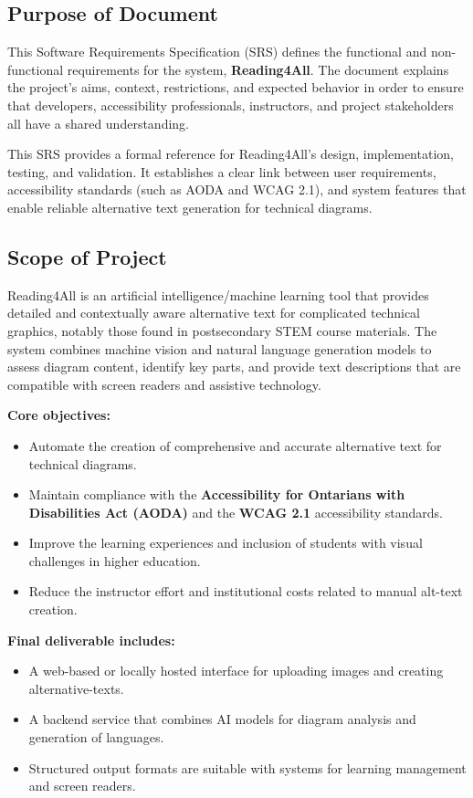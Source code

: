 \documentclass[12pt]{article}
\begin{document}
\subsection{Purpose of Document}
This Software Requirements Specification (SRS) defines the functional
and non-functional requirements for the \progname{} system,
\textbf{Reading4All}. The document explains the project's aims,
context, restrictions, and expected behavior in order to ensure that
developers, accessibility professionals, instructors, and project
stakeholders all have a shared understanding.

This SRS provides a formal reference for Reading4All's design,
implementation, testing, and validation. It establishes a clear link
between user requirements, accessibility standards (such as AODA and
WCAG 2.1), and system features that enable reliable alternative text
generation for technical diagrams.

\subsection{Scope of Project}
Reading4All is an artificial intelligence/machine learning tool that
provides detailed and contextually aware alternative text for
complicated technical graphics, notably those found in postsecondary
STEM course materials. The system combines machine vision and natural
language generation models to assess diagram content, identify key
parts, and provide text descriptions that are compatible with screen
readers and assistive technology.

\noindent \textbf{Core objectives:}
\begin{itemize}
  \item Automate the creation of comprehensive and accurate
    alternative text for technical diagrams.
  \item Maintain compliance with the \textbf{Accessibility for
    Ontarians with Disabilities Act (AODA)} and the \textbf{WCAG 2.1}
    accessibility standards.
  \item Improve the learning experiences and inclusion of students
    with visual challenges in higher education.
  \item Reduce the instructor effort and institutional costs related
    to manual alt-text creation.
\end{itemize}

\noindent \textbf{Final deliverable includes:}
\begin{itemize}
  \item A web-based or locally hosted interface for uploading images
    and creating alternative-texts.
  \item A backend service that combines AI models for diagram
    analysis and generation of languages.
  \item Structured output formats are suitable with systems for
    learning management and screen readers.
\end{itemize}
\end{document}
